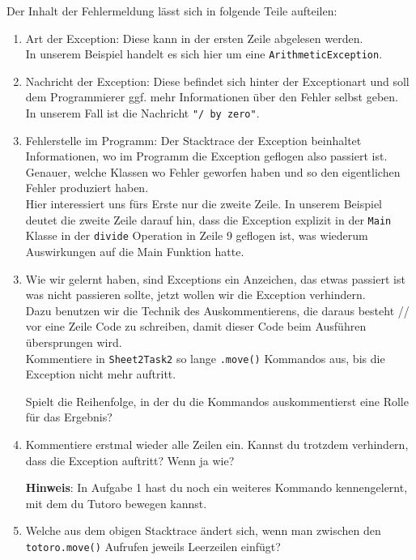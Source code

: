 \begin{Infobox}[Exception]
    Der Inhalt der Fehlermeldung lässt sich in folgende Teile aufteilen:

\begin{enumerate}[label=\roman*)]
\item Art der Exception: Diese kann in der ersten Zeile abgelesen werden.\\
In unserem Beispiel handelt es sich hier um eine \lstinline{ArithmeticException}.
\item Nachricht der Exception: Diese befindet sich hinter der Exceptionart und soll dem Programmierer ggf. mehr Informationen über den Fehler selbst geben.\\
In unserem Fall ist die Nachricht \lstinline{"/ by zero"}.
\item Fehlerstelle im Programm: Der Stacktrace der Exception beinhaltet Informationen, wo im Programm die Exception geflogen also passiert ist. Genauer, welche Klassen wo Fehler geworfen haben und so den eigentlichen Fehler produziert haben.\\
Hier interessiert uns fürs Erste nur die zweite Zeile. In unserem Beispiel deutet die zweite Zeile darauf hin, dass die Exception explizit in der \lstinline{Main} Klasse in der \lstinline{divide}
Operation in Zeile 9 geflogen ist, was wiederum Auswirkungen auf die Main Funktion hatte.
    \end{enumerate}

\end{Infobox}


\begin{enumerate}[label=\alph*)] \setcounter{enumi}{2}

    \item Wie wir gelernt haben, sind Exceptions ein Anzeichen, das etwas passiert ist was nicht passieren sollte, jetzt wollen wir die Exception verhindern.\\
Dazu benutzen wir die Technik des Auskommentierens, die daraus besteht // vor eine Zeile Code zu schreiben, damit dieser Code beim Ausführen übersprungen wird.\\
Kommentiere in \lstinline{Sheet2Task2} so lange \lstinline{.move()} Kommandos aus, bis die Exception nicht mehr auftritt.

Spielt die Reihenfolge, in der du die Kommandos auskommentierst eine Rolle für das Ergebnis?
\item Kommentiere erstmal wieder alle Zeilen ein.
Kannst du trotzdem verhindern, dass die Exception auftritt?
Wenn ja wie?

\textbf{Hinweis}: In Aufgabe 1 hast du noch ein weiteres Kommando kennengelernt, mit dem du Tutoro bewegen kannst.

\item \optional Welche  aus dem obigen Stacktrace ändert sich, wenn man zwischen den \lstinline{totoro.move()} Aufrufen jeweils Leerzeilen einfügt?
\end{enumerate}
 
